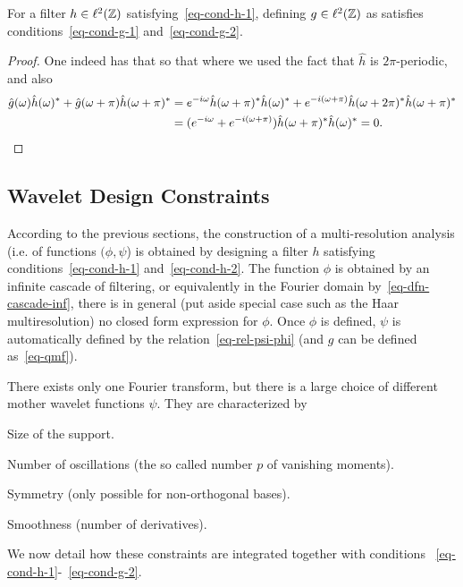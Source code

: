 \begin{prop}
	For a filter $h \in \ell^2(\mathbb{Z})$ satisfying~\eqref{eq-cond-h-1}, defining $g \in \ell^2(\mathbb{Z})$ as
	satisfies conditions~\eqref{eq-cond-g-1} and~\eqref{eq-cond-g-2}.
\end{prop}

\begin{proof}
	One indeed has that 
	so that 
	where we used the fact that $\hat h$ is $2\pi$-periodic, 
	and also 
	\begin{align*}
		\hat g(\omega) \hat h(\omega)^* + \hat g(\omega+\pi) \hat h(\omega+\pi)^* &= 
		e^{-i \omega} \hat h(\omega+\pi)^* \hat h(\omega)^* + e^{-i (\omega+\pi)} \hat h(\omega+2\pi)^* \hat h(\omega+\pi)^* \\
		&=
		(e^{-i \omega}+e^{-i (\omega+\pi)}) \hat h(\omega+\pi)^* \hat h(\omega)^*
		=0.
	\end{align*}
\end{proof}





\subsection{Wavelet Design Constraints}

According to the previous sections, the construction of a multi-resolution analysis (i.e. of functions $(\phi,\psi$) is obtained by designing a filter $h$ satisfying conditions~\eqref{eq-cond-h-1} and~\eqref{eq-cond-h-2}. The function $\phi$ is obtained by an infinite cascade of filtering, or equivalently in the Fourier domain by~\eqref{eq-dfn-cascade-inf}, there is in general (put aside special case such as the Haar multiresolution) no closed form expression for $\phi$. Once $\phi$ is defined, $\psi$ is automatically defined by the relation~\eqref{eq-rel-psi-phi} (and $g$ can be defined as~\eqref{eq-qmf}). 

There exists only one Fourier transform, but there is a large choice of different mother wavelet functions $\psi$. They are characterized by
\begin{rs}
	\item Size of the support.
	\item Number of oscillations (the so called number $p$ of vanishing moments).
	\item Symmetry (only possible for non-orthogonal bases).
	\item Smoothness (number of derivatives).
\end{rs}
We now detail how these constraints are integrated together with conditions ~\eqref{eq-cond-h-1}-~\eqref{eq-cond-g-2}.

